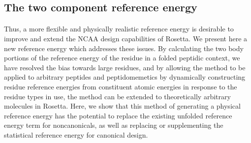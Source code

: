\subsection{The two component reference energy}
\paragraph{}
Thus, a more flexible and physically realistic reference energy is desirable to improve and extend the NCAA design capabilities of Rosetta.
We present here a new reference energy which addresses these issues.
By calculating the two body portions of the reference energy of the residue in a folded peptidic context, we have resolved the bias towards large residues, and by allowing the method to be applied to arbitrary peptides and peptidomemetics by dynamically constructing residue reference energies from constituent atomic energies in response to the residue types in use, the method can be extended to theoretically arbitrary molecules in Rosetta.
Here, we show that this method of generating a physical reference energy has the potential to replace the existing unfolded reference energy term for noncanonicals, as well as replacing or supplementing the statistical reference energy for canonical design.

